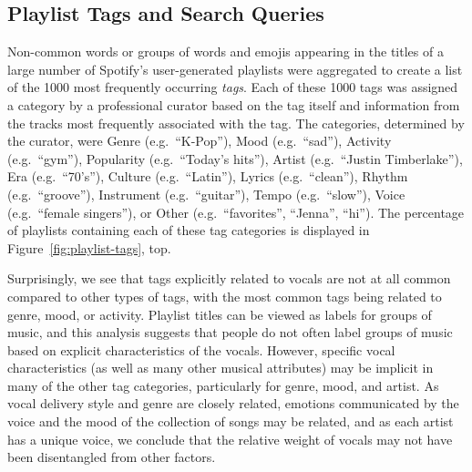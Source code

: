 \documentclass{article}
\begin{document}
\subsection{Playlist Tags and Search Queries}
Non-common words or groups of words and emojis appearing in the titles of a large number of Spotify's user-generated playlists were aggregated to create a list of the 1000 most frequently occurring \emph{tags}.
Each of these 1000 tags was assigned a category by a professional curator based on the tag itself and information from the tracks most frequently associated with the tag.
The categories, determined by the curator, were Genre (e.g.~``K-Pop''), Mood (e.g.~``sad''), Activity (e.g.~``gym''), Popularity (e.g.~``Today's hits''), Artist (e.g.~``Justin Timberlake''), Era (e.g.~``70's''), Culture (e.g.~``Latin''), Lyrics (e.g.~``clean''), Rhythm (e.g.~``groove''), Instrument (e.g.~``guitar''), Tempo (e.g.~``slow''), Voice (e.g.~``female singers''), or Other (e.g.~``favorites'', ``Jenna'', ``hi'').
The percentage of playlists containing each of these tag categories is displayed in Figure~\ref{fig:playlist-tags}, top.

Surprisingly, we see that tags explicitly related to vocals are not at all common compared to other types of tags, with the most common tags being related to genre, mood, or activity. Playlist titles can be viewed as labels for groups of music, and this analysis suggests that people do not often label groups of music based on explicit characteristics of the vocals.
However, specific vocal characteristics (as well as many other musical attributes) may be implicit in many of the other tag categories, particularly for genre, mood, and artist. As vocal delivery style and genre are closely related, emotions communicated by the voice and the mood of the collection of songs may be related, and as each artist has a unique voice, we conclude that the relative weight of vocals may not have been disentangled from other factors.
\end{document}
